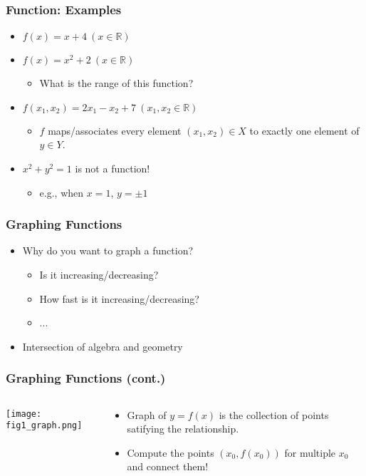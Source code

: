 \documentclass[pdflatex, 12pt]{beamer}
\newcommand{\R}{\mathbb{R}}
\begin{document}
\begin{frame}
\frametitle{Function: Examples}
\begin{itemize}
\item $f(x) = x + 4 \ (x \in \R)$
\vspace{0.4cm}
\item $f(x) = x^2 + 2 \ (x \in \R)$
 \begin{itemize}
 \item What is the range of this function?
 \end{itemize}
\vspace{0.4cm}
\item $f(x_1, x_2) = 2x_1 - x_2 + 7 \ (x_1, x_2 \in \R)$
 \begin{itemize}
 \item $f$ maps/associates every element $(x_1, x_2) \in X$ to exactly one element of $y \in Y$.
 \end{itemize}
\vspace{0.4cm}
\item $x^2 + y^2 = 1$ is not a function!
 \begin{itemize}
 \item e.g., when $x = 1$, $y = \pm 1$
 \end{itemize}
\end{itemize}
\end{frame}

\begin{frame}
\frametitle{Graphing Functions}
\begin{itemize}
\item Why do you want to graph a function?
 \begin{itemize}
 \item Is it increasing/decreasing?
 \item How fast is it increasing/decreasing?
 \item ...
 \end{itemize}
\vspace{0.4cm}
\item Intersection of algebra and geometry
\end{itemize}
\end{frame}

\begin{frame}
\frametitle{Graphing Functions (cont.)}
\begin{columns}
\begin{column}{0.5\textwidth}
\texttt{[image: fig1\_graph.png]}
\end{column}
\begin{column}{0.5\textwidth}
\begin{itemize}
\item Graph of $y = f(x)$ is the collection of points satifying the relationship.
\vspace{0.4cm}
\item Compute the points $(x_0, f(x_0))$ for multiple $x_0$ and connect them!
\end{itemize}
\end{column}
\end{columns}
\end{frame}
\end{document}
